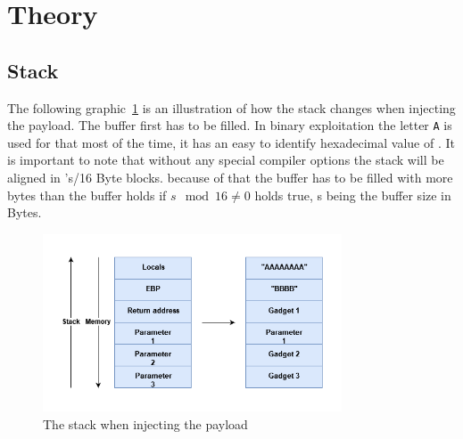 \documentclass[journal=tosc,submission, notanonymous]{iacrtrans}
\begin{document}
\section{Theory}
\subsection{Stack}
The following graphic~\cref{fig:stack} is an illustration of how the stack changes when injecting the payload. The buffer first has to be filled. In binary exploitation the letter \Verb+A+ is used for that most of the time, it has an easy to identify hexadecimal value of . It is important to note that without any special compiler options the stack will be aligned in 's/16 Byte blocks. because of that the buffer has to be filled with more bytes than the buffer holds if $s \mod 16 \neq 0$ holds true, s being the buffer size in Bytes.
\begin{figure}[h!]
  \centering
  \includegraphics[width=0.79\textwidth]{stackropoffsec.png}
  \caption{The stack when injecting the payload}
  \label{fig:stack}
\end{figure}
\\
\end{document}
